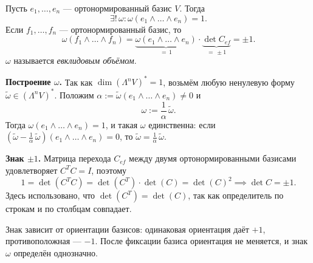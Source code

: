 \begin{definition}
    Пусть $e_1, \dots, e_n$ --- ортонормированный базис $V$. Тогда
    \[
        \exists!\, \omega \colon \omega(e_1 \wedge \dots \wedge e_n) = 1.
    \]
    Если $f_1, \dots, f_n$ --- ортонормированный базис, то
    \[
        \omega(f_1 \wedge \dots \wedge f_n)
        = \underbrace{\omega(e_1 \wedge \dots \wedge e_n)}_{=\,1}
          \cdot
          \underbrace{\det C_{ef}}_{=\,\pm 1}
        = \pm 1.
    \]
    $\omega$ называется \emph{евклидовым объёмом}.
    \begin{remark}
        \textbf{Построение $\omega$.} Так как $\dim(\Lambda^n V)^* = 1$, возьмём
        любую ненулевую форму $\tilde{\omega} \in (\Lambda^n V)^*$.
        Положим $\alpha := \tilde{\omega}(e_1 \wedge \dots \wedge e_n) \neq 0$ и
        \[
            \omega := \frac{1}{\alpha}\,\tilde{\omega}.
        \]
        Тогда $\omega(e_1 \wedge \dots \wedge e_n) = 1$, и такая $\omega$ единственна:
        если $(\widetilde{\omega} - \frac{1}{\alpha}\,\tilde{\omega})(e_1 \wedge \dots \wedge e_n) = 0$,
        то $\widetilde\omega = \frac{1}{\alpha}\,\tilde{\omega}$.

        \textbf{Знак $\pm 1$.} Матрица перехода $C_{ef}$ между двумя
            ортонормированными базисами удовлетворяет $C^T C = I$, поэтому
            \[
                1 = \det(C^T C) = \det(C^T)\cdot\det(C) = \det(C)^2
                \implies \det C = \pm 1.
            \]
            Здесь использовано, что $\det(C^T) = \det(C)$, так как
            определитель по строкам и по столбцам совпадает.

            Знак зависит от ориентации базисов: одинаковая ориентация даёт $+1$,
            противоположная --- $-1$. После фиксации базиса ориентация не меняется,
            и знак $\omega$ определён однозначно.
    \end{remark}
\end{definition}

